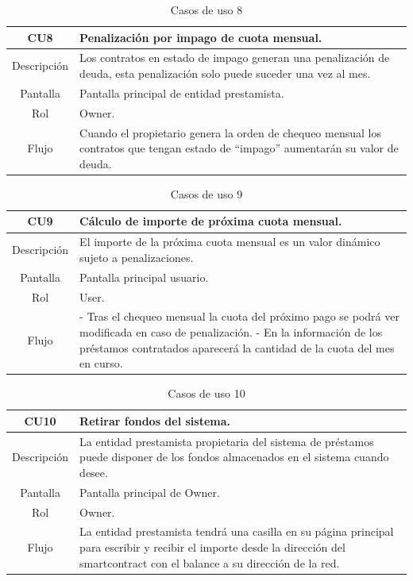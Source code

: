 \begin{table}[H]
\centering
\caption{Casos de uso 8}
\begin{tabular}{|c|p{12cm}|}
    \hline
    \rowcolor[HTML]{D0E7FF}
    CU8 & Penalización por impago de cuota mensual. \\ \hline
    Descripción   & Los contratos en estado de impago generan una penalización de deuda, esta
penalización solo puede suceder una vez al mes.  \\ \hline
    Pantalla     & Pantalla principal de entidad prestamista.  \\ \hline
    Rol     & Owner. \\ \hline
    Flujo     &    Cuando el propietario genera la orden de chequeo mensual los contratos
que tengan estado de \enquote{impago} aumentarán su valor de deuda.
                 \\ \hline
\end{tabular}
\end{table}

\begin{table}[H]
\centering
\caption{Casos de uso 9}
\begin{tabular}{|c|p{12cm}|}
    \hline
    \rowcolor[HTML]{D0E7FF}
    CU9 & Cálculo de importe de próxima cuota mensual. \\ \hline
    Descripción   & El importe de la próxima cuota mensual es un valor dinámico sujeto a
penalizaciones.  \\ \hline
    Pantalla     & Pantalla principal usuario.  \\ \hline
    Rol     & User. \\ \hline
    Flujo     &    - Tras el chequeo mensual la cuota del próximo pago se podrá ver
modificada en caso de penalización. \newline
                   - En la información de los préstamos contratados aparecerá la cantidad de la
cuota del mes en curso.
                 \\ \hline
\end{tabular}
\end{table}

\begin{table}[H]
\centering
\caption{Casos de uso 10}
\begin{tabular}{|c|p{12cm}|}
    \hline
    \rowcolor[HTML]{D0E7FF}
    CU10 & Retirar fondos del sistema. \\ \hline
    Descripción   & La entidad prestamista propietaria  del sistema de préstamos puede disponer de los fondos almacenados en el sistema
cuando desee.  \\ \hline
    Pantalla     & Pantalla principal de Owner.   \\ \hline
    Rol     & Owner. \\ \hline
    Flujo     &    La entidad prestamista tendrá una casilla en su página principal para escribir y recibir el
importe desde la dirección del \gls{smartcontract} con el balance a su dirección de la red.
                 \\ \hline
\end{tabular}
\end{table}

